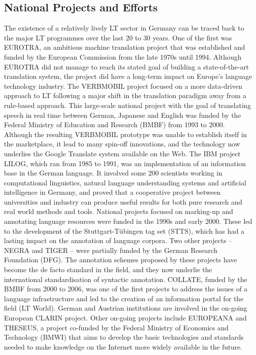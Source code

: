 \documentclass[]{../metanetpaper}
\begin{document}
	\subsection{National Projects and Efforts}
The existence of a relatively lively LT sector in Germany can be traced back to the major LT programmes over the last 20 to 30 years. One of the first was EUROTRA, an ambitious machine translation project that was established and funded by the European Commission from the late 1970s until 1994. Although EUROTRA did not manage to reach its stated goal of building a state-of-the-art translation system, the project did have a long-term impact on Europe’s language technology industry. The VERBMOBIL project focused on a more data-driven approach to LT following a major shift in the translation paradigm away from a rule-based approach. This large-scale national project with the goal of translating speech in real time between German, Japanese and English was funded by the Federal Ministry of Education and Research (BMBF) from 1993 to 2000. Although the resulting VERBMOBIL prototype was unable to establish itself in the marketplace, it lead to many spin-off innovations, and the technology now underlies the Google Translate system available on the Web. 
The IBM project LILOG, which ran from 1985 to 1991, was an implementation of an information base in the German language. It involved some 200 scientists working in computational linguistics, natural language understanding systems and artificial intelligence in Germany, and proved that a cooperative project between universities and industry can produce useful results for both pure research and real world methods and tools.
National projects focused on marking-up and annotating language resources were funded in the 1990s and early 2000. These led to the development of the Stuttgart-Tübingen tag set (STTS), which has had a lasting impact on the annotation of language corpora. Two other projects – NEGRA and TIGER – were partially funded by the German Research Foundation (DFG). The annotation schemes proposed by these projects have become the de facto standard in the field, and they now underlie the international standardisation of syntactic annotation.
COLLATE, funded by the BMBF from 2000 to 2006, was one of the first projects to address the issues of a language infrastructure and led to the creation of an information portal for the field (LT World). German and Austrian institutions are involved in the on-going European CLARIN project. Other on-going projects include EUROPEANA and THESEUS, a project co-funded by the Federal Ministry of Economics and Technology (BMWI) that aims to develop the basic technologies and standards needed to make knowledge on the Internet more widely available in the future. 
\end{document}
